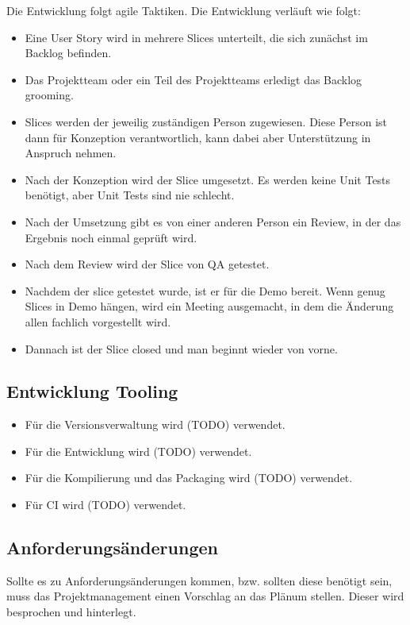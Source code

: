 Die Entwicklung folgt agile Taktiken. Die Entwicklung verläuft wie folgt:

\begin{itemize}
	\item Eine User Story wird in mehrere Slices unterteilt, die sich zunächst im Backlog befinden.
	\item Das Projektteam oder ein Teil des Projektteams erledigt das Backlog grooming.
	\item Slices werden der jeweilig zuständigen Person zugewiesen. Diese Person ist dann für Konzeption verantwortlich, kann dabei aber Unterstützung in Anspruch nehmen.
	\item Nach der Konzeption wird der Slice umgesetzt. Es werden keine Unit Tests benötigt, aber Unit Tests sind nie schlecht.
	\item Nach der Umsetzung gibt es von einer anderen Person ein Review, in der das Ergebnis noch einmal geprüft wird.
	\item Nach dem Review wird der Slice von QA getestet.
	\item Nachdem der slice getestet wurde, ist er für die Demo bereit. Wenn genug Slices in Demo hängen, wird ein Meeting ausgemacht, in dem die Änderung allen fachlich vorgestellt wird.
	\item Dannach ist der Slice closed und man beginnt wieder von vorne.
\end{itemize}

\subsection{Entwicklung Tooling}

\begin{itemize}
	\item Für die Versionsverwaltung wird {\color{red}(TODO)} verwendet.
	\item Für die Entwicklung wird {\color{red}(TODO)} verwendet.
	\item Für die Kompilierung und das Packaging wird {\color{red}(TODO)} verwendet.
	\item Für CI wird {\color{red}(TODO)} verwendet.
\end{itemize}

\subsection{Anforderungsänderungen}

Sollte es zu Anforderungsänderungen kommen, bzw. sollten diese benötigt sein, muss das Projektmanagement einen Vorschlag an das Plänum stellen. Dieser wird besprochen und hinterlegt.

